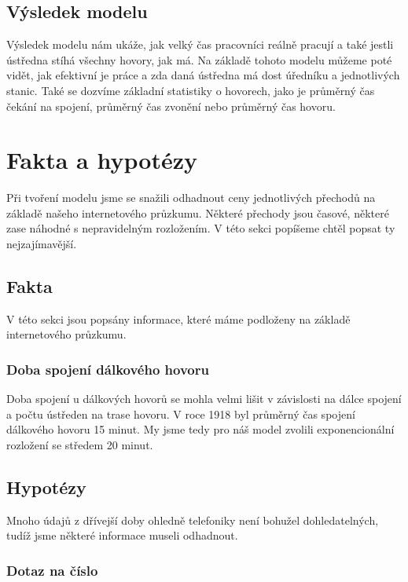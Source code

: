 \documentclass{article}
\begin{document}
\subsection{Výsledek modelu}

Výsledek modelu nám ukáže, jak velký čas pracovníci reálně pracují a také
jestli ústředna stíhá všechny hovory, jak má. Na základě tohoto modelu můžeme
poté vidět, jak efektivní je práce a zda daná ústředna má dost úředníku a
jednotlivých stanic. Také se dozvíme základní statistiky o hovorech, jako je
průměrný čas čekání na spojení, průměrný čas zvonění nebo průměrný čas hovoru.

\section{Fakta a hypotézy}

Při tvoření modelu jsme se snažili odhadnout ceny jednotlivých přechodů na
základě našeho internetového průzkumu. Některé přechody jsou časové, některé
zase náhodné s nepravidelným rozložením. V této sekci popíšeme chtěl popsat ty
nejzajímavější.

\subsection{Fakta}

V této sekci jsou popsány informace, které máme podloženy na základě
internetového průzkumu.

\subsubsection*{Doba spojení dálkového hovoru}

Doba spojení u dálkových hovorů se mohla velmi lišit v závislosti na dálce
spojení a počtu ústředen na trase hovoru. V roce 1918 byl průměrný čas spojení
dálkového hovoru 15 minut\cite{wikipedia}. My jsme tedy pro náš model zvolili
exponencionální rozložení se středem 20 minut.

\subsection{Hypotézy}

Mnoho údajů z dřívejší doby ohledně telefoniky není bohužel dohledatelných,
tudíž jsme některé informace museli odhadnout.

\subsubsection*{Dotaz na číslo}
\end{document}
